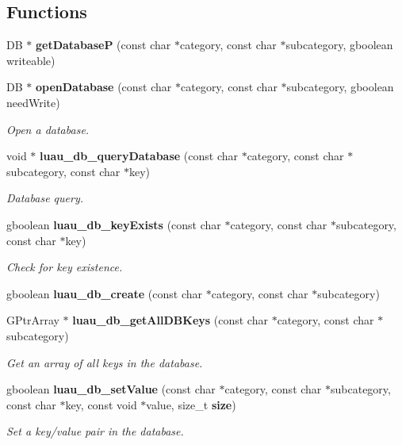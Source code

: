 \subsection*{Functions}
\begin{CompactItemize}
\item 
DB $\ast$ {\bf get\-Database\-P} (const char $\ast$category, const char $\ast$subcategory, gboolean writeable)
\item 
DB $\ast$ {\bf open\-Database} (const char $\ast$category, const char $\ast$subcategory, gboolean need\-Write)
\begin{CompactList}\small\item\em Open a database. \item\end{CompactList}\item 
void $\ast$ {\bf luau\_\-db\_\-query\-Database} (const char $\ast$category, const char $\ast$subcategory, const char $\ast$key)
\begin{CompactList}\small\item\em Database query. \item\end{CompactList}\item 
gboolean {\bf luau\_\-db\_\-key\-Exists} (const char $\ast$category, const char $\ast$subcategory, const char $\ast$key)
\begin{CompactList}\small\item\em Check for key existence. \item\end{CompactList}\item 
gboolean {\bf luau\_\-db\_\-create} (const char $\ast$category, const char $\ast$subcategory)
\item 
GPtr\-Array $\ast$ {\bf luau\_\-db\_\-get\-All\-DBKeys} (const char $\ast$category, const char $\ast$subcategory)
\begin{CompactList}\small\item\em Get an array of all keys in the database. \item\end{CompactList}\item 
gboolean {\bf luau\_\-db\_\-set\-Value} (const char $\ast$category, const char $\ast$subcategory, const char $\ast$key, const void $\ast$value, size\_\-t {\bf size})
\begin{CompactList}\small\item\em Set a key/value pair in the database. \item\end{CompactList}\item 

\end{CompactItemize}
